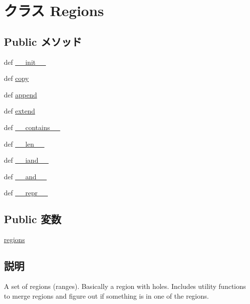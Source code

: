 \hypertarget{classm5_1_1util_1_1region_1_1Regions}{
\section{クラス Regions}
\label{classm5_1_1util_1_1region_1_1Regions}
}
\subsection*{Public メソッド}
\begin{DoxyCompactItemize}
\item 
def \hyperlink{classm5_1_1util_1_1region_1_1Regions_ac775ee34451fdfa742b318538164070e}{\_\-\_\-init\_\-\_\-}
\item 
def \hyperlink{classm5_1_1util_1_1region_1_1Regions_a2fa43c22b5f7af93ba8b4a56871f006a}{copy}
\item 
def \hyperlink{classm5_1_1util_1_1region_1_1Regions_a69e6c03a1e37f0277f464db19e5fd985}{append}
\item 
def \hyperlink{classm5_1_1util_1_1region_1_1Regions_a2905cc8a60ce1ff6b37b5f8810f4ae5a}{extend}
\item 
def \hyperlink{classm5_1_1util_1_1region_1_1Regions_a31ecdf34e79a47aea99a17eea32b7ac2}{\_\-\_\-contains\_\-\_\-}
\item 
def \hyperlink{classm5_1_1util_1_1region_1_1Regions_af6412d48d9a71eac81e3195b52455aaa}{\_\-\_\-len\_\-\_\-}
\item 
def \hyperlink{classm5_1_1util_1_1region_1_1Regions_a35f5f4cebadafa75c811f7db5370daa5}{\_\-\_\-iand\_\-\_\-}
\item 
def \hyperlink{classm5_1_1util_1_1region_1_1Regions_af78759c636c9d9a85bb3dd913611e7b6}{\_\-\_\-and\_\-\_\-}
\item 
def \hyperlink{classm5_1_1util_1_1region_1_1Regions_ad8b9328939df072e4740cd9a63189744}{\_\-\_\-repr\_\-\_\-}
\end{DoxyCompactItemize}
\subsection*{Public 変数}
\begin{DoxyCompactItemize}
\item 
\hyperlink{classm5_1_1util_1_1region_1_1Regions_a4c4786354df7358bf12c3c65069dd8b7}{regions}
\end{DoxyCompactItemize}


\subsection{説明}
\begin{DoxyVerb}A set of regions (ranges).  Basically a region with holes.
Includes utility functions to merge regions and figure out if
something is in one of the regions.\end{DoxyVerb}
 

